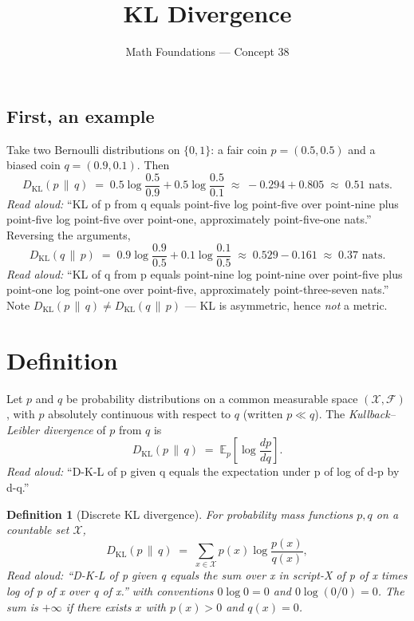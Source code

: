 \documentclass[11pt]{article}
\title{KL Divergence}
\author{Math Foundations --- Concept 38}
\date{}
\newtheorem{definition}[theorem]{Definition}
\begin{document}
\maketitle

\subsection*{First, an example}

Take two Bernoulli distributions on $\{0, 1\}$: a fair coin $p = (0.5, 0.5)$ and a biased coin $q = (0.9, 0.1)$. Then
\[
D_{\mathrm{KL}}(p \,\|\, q) \;=\; 0.5 \log \frac{0.5}{0.9} + 0.5 \log \frac{0.5}{0.1} \;\approx\; -0.294 + 0.805 \;\approx\; 0.51 \text{ nats}.
\]
\emph{Read aloud:} ``KL of p from q equals point-five log point-five over point-nine plus point-five log point-five over point-one, approximately point-five-one nats.''
Reversing the arguments,
\[
D_{\mathrm{KL}}(q \,\|\, p) \;=\; 0.9 \log \frac{0.9}{0.5} + 0.1 \log \frac{0.1}{0.5} \;\approx\; 0.529 - 0.161 \;\approx\; 0.37 \text{ nats}.
\]
\emph{Read aloud:} ``KL of q from p equals point-nine log point-nine over point-five plus point-one log point-one over point-five, approximately point-three-seven nats.''
Note $D_{\mathrm{KL}}(p \,\|\, q) \neq D_{\mathrm{KL}}(q \,\|\, p)$ --- KL is asymmetric, hence \emph{not} a metric.

\section{Definition}

Let $p$ and $q$ be probability distributions on a common measurable space $(\mathcal{X}, \mathcal{F})$, with $p$ absolutely continuous with respect to $q$ (written $p \ll q$). The \emph{Kullback--Leibler divergence} of $p$ from $q$ is
\[
D_{\mathrm{KL}}(p \,\|\, q) \;=\; \mathbb{E}_{p}\!\left[\log \frac{dp}{dq}\right].
\]
\emph{Read aloud:} ``D-K-L of p given q equals the expectation under p of log of d-p by d-q.''

\begin{definition}[Discrete KL divergence]
For probability mass functions $p, q$ on a countable set $\mathcal{X}$,
\[
D_{\mathrm{KL}}(p \,\|\, q) \;=\; \sum_{x \in \mathcal{X}} p(x) \log \frac{p(x)}{q(x)},
\]
\emph{Read aloud:} ``D-K-L of p given q equals the sum over x in script-X of p of x times log of p of x over q of x.''
with conventions $0 \log 0 = 0$ and $0 \log (0/0) = 0$. The sum is $+\infty$ if there exists $x$ with $p(x) > 0$ and $q(x) = 0$.
\end{definition}
\end{document}
